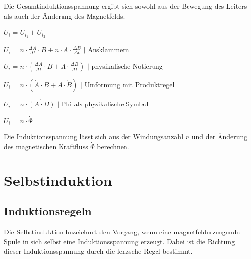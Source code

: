 \documentclass{article}
\begin{document}
\normalsize
Die Gesamtinduktionsspannung ergibt sich sowohl aus der Bewegung des Leiters
als auch der Änderung des Magnetfelds.
\newline

\Large
$U_{i} = U_{i_1} + U_{i_2}$

\vspace{0.3cm}
$U_{i} = n \cdot \frac{\Delta A}{\Delta t} \cdot B + n \cdot A \cdot \frac{\Delta B}{\Delta t}$ \hspace{0.25cm}$|$ \normalsize Ausklammern

\vspace{0.3cm}
\Large
$U_{i} = n \cdot (\frac{\Delta A}{\Delta t} \cdot B + A \cdot \frac{\Delta B}{\Delta t})$  \hspace{0.25cm}$|$ \normalsize physikalische Notierung

\vspace{0.3cm}
\Large
$U_{i} = n \cdot (\dot{A} \cdot B + A \cdot \dot{B})$ \hspace{0.25cm}$|$ \normalsize Umformung mit Produktregel

\vspace{0.3cm}
\Large
$U_{i} = n \cdot \dot{(A \cdot B)}$  \hspace{0.25cm}$|$ \normalsize Phi als physikalische Symbol

\vspace{0.3cm}
\Large
$U_{i} = n \cdot \dot{\Phi}$
\newline

\normalsize
Die Induktionsspannung lässt sich aus der Windungsanzahl $n$ und der Änderung des
magnetischen Kraftfluss $\dot{\Phi}$ berechnen.

\newpage

\section*{Selbstinduktion}

\setlength{\columnsep}{2.5cm}

\subsection*{Induktionsregeln}

\normalsize
\begin{multicols}{2}
    Die Selbstinduktion bezeichnet den Vorgang, wenn eine magnetfelderzeugende Spule
    in sich selbst eine Induktionsspannung erzeugt. Dabei ist die Richtung dieser
    Induktionsspannung durch die lenzsche Regel bestimmt.

    \columnbreak


    \setlength\fboxsep{0.4cm}

    \noindent{}

\end{multicols}
\end{document}
